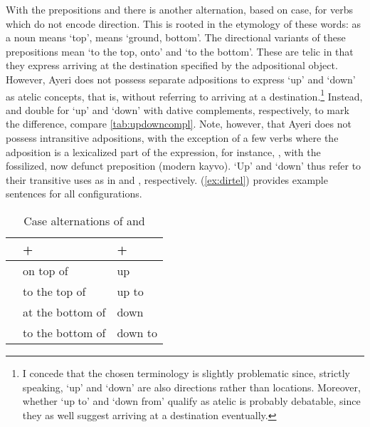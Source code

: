 With the prepositions  and  there is another alternation, based on case, for verbs which do not
encode direction. This is rooted in the etymology of these words:
 as a noun means `top',  means `ground,
bottom'. The directional variants of these prepositions mean `to the top, onto'
and `to the bottom'. These are telic in that they express arriving
at the destination specified by the adpositional object. However, Ayeri does
not possess separate adpositions to express `up' and `down' as atelic concepts,
that is, without referring to arriving at a destination.\footnote{I concede
that the chosen terminology is slightly problematic since, strictly speaking,
`up' and `down' are also directions rather than locations. Moreover, whether
`up to' and `down from' qualify as atelic is probably debatable, since they as
well suggest arriving at a destination eventually.} Instead,
 and  double for `up' and `down' with dative
complements, respectively, to mark the difference, compare 
\autoref{tab:updowncompl}. Note, however, that Ayeri does not possess
intransitive adpositions, with the exception of a few verbs where the
adposition is a lexicalized part of the expression, for instance,
, with the fossilized, now
defunct preposition  (modern 
{kayvo}). `Up' and `down' thus refer to their transitive uses as in  and , respectively. (\ref{ex:dirtel}) provides
example sentences for all configurations.

\begin{table}[tp]\centering
\caption{Case alternations of  and }

\begin{tabu} to \linewidth {X X[c] X[c]}
\toprule\tableheaderfont

%
	& +~\Loc
	& +~\Dat
	\\

\toprule

	& on top of
	& up
	\\


	& to the top of
	& up to
	\\

\midrule

	& at the bottom of
	& down
	\\


	& to the bottom of
	& down to
	\\

\bottomrule
\end{tabu}

\label{tab:updowncompl}
\end{table}

